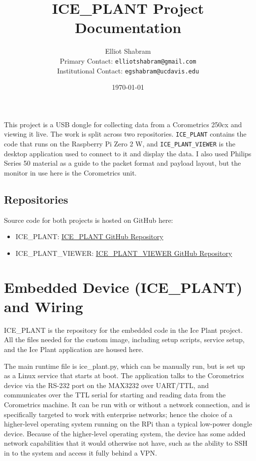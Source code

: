 \documentclass[11pt]{article}
\title{ICE\_PLANT Project Documentation}
\author{Elliot Shabram\\Primary Contact: \texttt{elliotshabram@gmail.com}\\Institutional Contact: \texttt{egshabram@ucdavis.edu}}
\date{\today}
\begin{document}
\maketitle

This project is a USB dongle for collecting data from a Corometrics 250cx and viewing it live. The work is split across two repositories. \texttt{ICE\_PLANT} contains the code that runs on the Raspberry Pi Zero 2 W, and \texttt{ICE\_PLANT\_VIEWER} is the desktop application used to connect to it and display the data. I also used Philips Series 50 material as a guide to the packet format and payload layout, but the monitor in use here is the Corometrics unit.

\subsection*{Repositories}
Source code for both projects is hosted on GitHub here:
\begin{itemize}
\item ICE\_PLANT: \href{https://github.com/eshabram/ICE_PLANT}{ICE\_PLANT GitHub Repository}
\item ICE\_PLANT\_VIEWER: \href{https://github.com/eshabram/ICE_PLANT_VIEWER}{ICE\_PLANT\_VIEWER GitHub Repository}
\end{itemize}

\section{Embedded Device (ICE\_PLANT) and Wiring}
ICE\_PLANT is the repository for the embedded code in the Ice Plant project. All the files needed for the custom image, including setup scripts, service setup, and the Ice Plant application are housed here.

The main runtime file is ice\_plant.py, which can be manually run, but is set up as a Linux service that starts at boot. The application talks to the Corometrics device via the RS-232 port on the MAX3232 over UART/TTL, and communicates over the TTL serial for starting and reading data from the Corometrics machine. It can be run with or without a network connection, and is specifically targeted to work with enterprise networks; hence the choice of a higher-level operating system running on the RPi than a typical low-power dongle device. Because of the higher-level operating system, the device has some added network capabilities that it would otherwise not have, such as the ability to SSH in to the system and access it fully behind a VPN.
\end{document}
